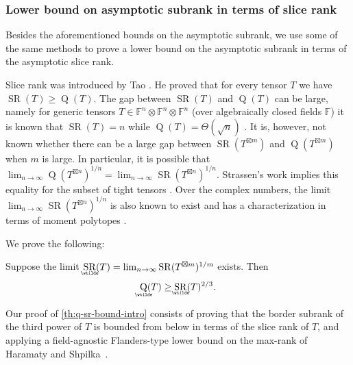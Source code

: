 \documentclass{daj}
\DeclareMathOperator{\subrank}{Q}
\DeclareMathOperator{\slicerank}{SR}
\DeclareMathOperator{\asympsubrank}{\underaccent{\wtilde}{Q}}
\DeclareMathOperator{\asympslicerank}{\underaccent{\wtilde}{SR}}
\DeclareMathOperator{\asympsupslicerank}{{SR}\!\wtilde{\phantom{X}\!\!}}
\newcommand{\FF}{\mathbb{F}}
\begin{document}
\subsubsection{Lower bound on asymptotic subrank in terms of slice rank}

Besides the aforementioned bounds on the asymptotic subrank, we use some of the same methods to prove a lower bound on the asymptotic subrank in terms of the asymptotic slice rank.

Slice rank was introduced by Tao \cite{tao}. He proved that for every tensor $T$ we have $\slicerank(T) \geq \subrank(T)$. The gap between $\slicerank(T)$ and $\subrank(T)$ can be large, namely for generic tensors $T \in \FF^n \otimes \FF^n \otimes \FF^n$ (over algebraically closed fields $\FF$) it is known that $\slicerank(T) = n$ while $\subrank(T) = \Theta(\sqrt{n})$ \cite{derksen_et_al:LIPIcs.CCC.2022.9}. 
%
It is, however, not known whether there can be a large gap between $\slicerank(T^{\boxtimes m})$ and $\subrank(T^{\boxtimes m})$ when $m$ is large. In particular, it is possible that $\lim_{n\to\infty} \subrank(T^{\boxtimes n})^{1/n} = \lim_{n\to\infty} \slicerank(T^{\boxtimes n})^{1/n}$. Strassen's work implies this equality for the subset of tight tensors \cite{strassen1991degeneration}. Over the complex numbers, the limit $\lim_{n\to\infty} \slicerank(T^{\boxtimes n})^{1/n}$ is also known to exist and has a characterization in terms of moment polytopes \cite{MR4495838}.

We prove the following:

\begin{theorem}
\label{th:q-sr-bound-intro}
Suppose the limit $\asympslicerank(T) = \lim_{n\to\infty} \slicerank(T^{\boxtimes m})^{1/m}$ exists. 
Then 
\[
%
\asympsubrank(T) \geq \asympslicerank(T)^{2/3}.
\]
\end{theorem}

Our proof of \autoref{th:q-sr-bound-intro} consists of proving that the border subrank of the third power of $T$ is bounded from below in terms of the slice rank of $T$, and applying a field-agnostic Flanders-type lower bound on the max-rank of Haramaty and Shpilka~\cite{haramaty2010structure}.
\end{document}
